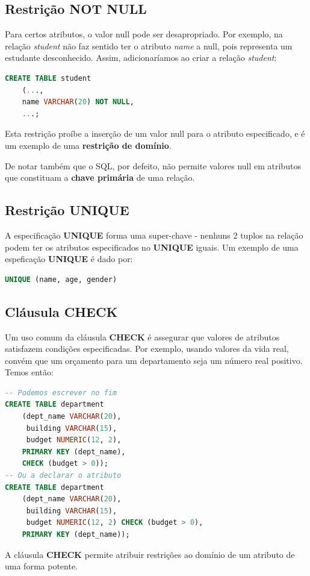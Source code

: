 \documentclass[oneside]{book}
\theoremstyle{definition}
\begin{document}
\subsection{Restrição NOT NULL}
Para certos atributos, o valor null pode ser desapropriado. Por exemplo, na relação \textit{student} não faz sentido ter o atributo \textit{name} a null, pois representa um estudante desconhecido.
Assim, adicionaríamos ao criar a relação \textit{student}:
\begin{lstlisting}[language=SQL, morekeywords={REFERENCES, REFRESH, MATERIALIZED, CONCURRENTLY}, framesep=8pt, xleftmargin=40pt, framexleftmargin=40pt, frame=tb, framerule=0pt]
CREATE TABLE student 
    (...,
    name VARCHAR(20) NOT NULL,
    ...;
\end{lstlisting}
Esta restrição proíbe a inserção de um valor null para o atributo especificado, e é um exemplo de uma \textbf{restrição de domínio}. 

De notar também que o SQL, por defeito, não permite valores null em atributos que constituam a \textbf{chave primária} de uma relação.

\subsection{Restrição UNIQUE}
A especificação \textbf{UNIQUE} forma uma super-chave - nenhuns 2 tuplos na relação podem ter os atributos especificados no \textbf{UNIQUE} iguais. Um exemplo de uma espeficação \textbf{UNIQUE} é dado por:
\begin{lstlisting}[language=SQL, morekeywords={REFERENCES, REFRESH, MATERIALIZED, CONCURRENTLY}, framesep=8pt, xleftmargin=40pt, framexleftmargin=40pt, frame=tb, framerule=0pt]
UNIQUE (name, age, gender)
\end{lstlisting}

\subsection{Cláusula CHECK}
Um uso comum da cláusula \textbf{CHECK} é assegurar que valores de atributos satisfazem condições especificadas. Por exemplo, usando valores da vida real, convém que um orçamento para um departamento seja um número real positivo.
Temos então:
\begin{lstlisting}[language=SQL, morekeywords={REFERENCES, REFRESH, MATERIALIZED, CONCURRENTLY}, framesep=8pt, xleftmargin=40pt, framexleftmargin=40pt, frame=tb, framerule=0pt]
-- Podemos escrever no fim
CREATE TABLE department
    (dept_name VARCHAR(20),
     building VARCHAR(15),
     budget NUMERIC(12, 2),
    PRIMARY KEY (dept_name),
    CHECK (budget > 0));
-- Ou a declarar o atributo
CREATE TABLE department
    (dept_name VARCHAR(20),
     building VARCHAR(15),
     budget NUMERIC(12, 2) CHECK (budget > 0),
    PRIMARY KEY (dept_name));
\end{lstlisting}
A cláusula \textbf{CHECK} permite atribuir restrições ao domínio de um atributo de uma forma potente.
\end{document}
